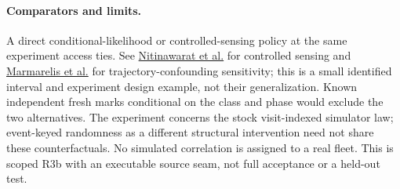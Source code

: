 \documentclass[11pt]{article}
\begin{document}
\paragraph{Comparators and limits.}
A direct conditional-likelihood or controlled-sensing policy at
the same experiment access ties. See
\href{https://arxiv.org/abs/1205.0858}{Nitinawarat et al.}
for controlled sensing and
\href{https://proceedings.mlr.press/v286/marmarelis25a.html}{Marmarelis et al.}
for trajectory-confounding sensitivity; this is a small identified
interval and experiment design example, not their generalization.
Known independent fresh marks conditional on the class and phase
would exclude the two alternatives. The experiment concerns
the stock visit-indexed simulator law; event-keyed randomness
as a different structural intervention need not share these
counterfactuals. No simulated correlation is assigned to a
real fleet. This is scoped R3b with an executable source seam,
not full acceptance or a held-out test.
\end{document}
